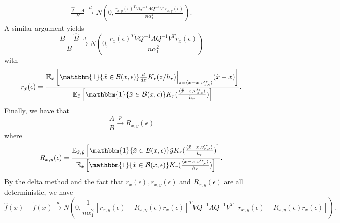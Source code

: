 \documentclass[11pt]{article}
\begin{document}
\begin{align*}
    \frac{\widehat{A} - A}{B} \overset{d}{\rightarrow} N\left(0, \frac{r_{x,y}(\epsilon)^TVQ^{-1}\Lambda Q^{-1}V^T r_{x,y}(\epsilon)}{n\alpha_1^2}\right).
\end{align*}
A similar argument yields 
\begin{equation}
    \frac{B - \hat{B}}{B} \overset{d}\rightarrow N\left(0, \frac{r_{x}(\epsilon)^TVQ^{-1}\Lambda Q^{-1}V^T r_x(\epsilon)}{n\alpha_1^2}\right)
\end{equation}
with 
\begin{equation}
    r_x(\epsilon) = \frac{\mathbb{E}_{\tilde{x}}\left[\mathbbm{1}\{\tilde{x} \in \mathcal{B}(x, \epsilon)\}\frac{d}{dz}K_r(z/h_r)\Big|_{z=\langle\tilde{x} - x, v'^*_{x, \epsilon}\rangle}(\tilde{x}-x)
\right]}{\mathbb{E}_{\tilde{x}}\left[\mathbbm{1}\{\tilde{x} \in \mathcal{B}(x, \epsilon)\}K_r(\frac{\langle \tilde{x} - x, v'^*_{x, \epsilon}\rangle}{h_r})\right]}.
\end{equation}
Finally, we have that
\begin{equation}
    \frac{A}{B} \overset{p}\rightarrow R_{x,y}(\epsilon)
\end{equation}
where 
\begin{equation}
    R_{x,y}(\epsilon) = \frac{\mathbb{E}_{\tilde{x}, \tilde{y}}\left[\mathbbm{1}\{\tilde{x} \in \mathcal{B}(x, \epsilon)\}\tilde{y}K_r(\frac{\langle \tilde{x} - x, v'^*_{x, \epsilon}\rangle}{h_r})\right]}{\mathbb{E}_{\tilde{x}}\left[\mathbbm{1}\{\tilde{x} \in \mathcal{B}(x, \epsilon)\}K_r(\frac{\langle \tilde{x} - x, v'^*_{x, \epsilon}\rangle}{h_r})\right]}.
\end{equation}
By the delta method and the fact that $r_x(\epsilon), r_{x,y}(\epsilon)$ and $R_{x,y}(\epsilon)$ are all deterministic, we have
\begin{equation}
    \hat{f}(x) - \tilde{f}(x) \overset{d}\rightarrow N\left(0, \frac{1}{n\alpha_1^2}\left[r_{x,y}(\epsilon) + R_{x,y}(\epsilon)r_x(\epsilon)\right]^TVQ^{-1}\Lambda Q^{-1}V^T\left[r_{x,y}(\epsilon) + R_{x,y}(\epsilon)r_x(\epsilon)\right]\right).
\end{equation}
\end{document}
